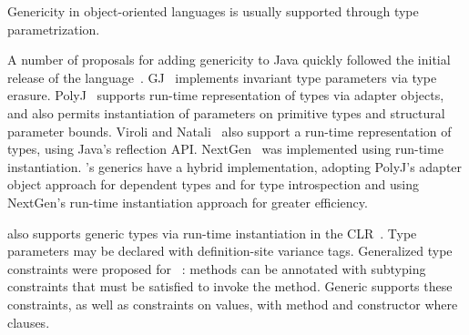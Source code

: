Genericity in object-oriented languages is usually
supported through
type parametrization.

A number of proposals 
for adding genericity to Java quickly followed
the initial release of
the language~\cite{GJ,java-popl97,thorup97,allen03}.
GJ~\cite{GJ} implements invariant type
parameters via type erasure.
PolyJ~\cite{java-popl97} supports run-time representation of types
via adapter objects, and also permits instantiation of
parameters on primitive types and structural parameter bounds.
Viroli and Natali~\cite{reflective-generics,type-passing-generics}
also support
a run-time representation of types, using Java's reflection API.
NextGen~\cite{nextgen,allen03} was implemented using run-time 
instantiation.
\Xten{}'s generics have a hybrid implementation, adopting PolyJ's
adapter object approach for dependent types and for 
type introspection and using NextGen's run-time
instantiation approach for greater efficiency.

\csharp also supports generic types via run-time instantiation in the
CLR~\cite{csharp-generics}.  Type parameters may be declared
with definition-site variance tags.
Generalized type constraints were proposed for
\csharp~\cite{emir06}: methods can be annotated with subtyping
constraints that must be satisfied to invoke the method.
Generic \Xten{} supports these constraints, as well as constraints
on values, with method and constructor where clauses.



